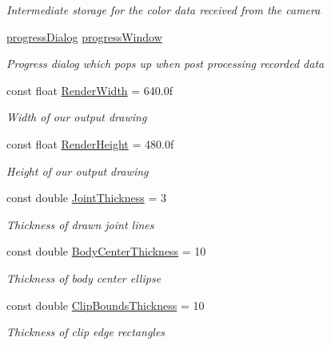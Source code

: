 \begin{DoxyCompactItemize}
\begin{DoxyCompactList}\small\item\em Intermediate storage for the color data received from the camera \end{DoxyCompactList}\item 
\hyperlink{classUTKinectSkeletonMovementDetector_1_1progressDialog}{progress\-Dialog} \hyperlink{classUTKinectSkeletonMovementDetector_1_1MainWindow_ad09c9b8b005cbcc09cb7d1acc722d7c4}{progress\-Window}
\begin{DoxyCompactList}\small\item\em Progress dialog which pops up when post processing recorded data \end{DoxyCompactList}\item 
const float \hyperlink{classUTKinectSkeletonMovementDetector_1_1MainWindow_af3b183ca66b6137dfa971ce2bd41ad61}{Render\-Width} = 640.\-0f
\begin{DoxyCompactList}\small\item\em Width of our output drawing \end{DoxyCompactList}\item 
const float \hyperlink{classUTKinectSkeletonMovementDetector_1_1MainWindow_a83c4f5f87333f29e1e75c98b7a6ba80c}{Render\-Height} = 480.\-0f
\begin{DoxyCompactList}\small\item\em Height of our output drawing \end{DoxyCompactList}\item 
const double \hyperlink{classUTKinectSkeletonMovementDetector_1_1MainWindow_a79ff56663c69c70ea3fa5045d5e37e8b}{Joint\-Thickness} = 3
\begin{DoxyCompactList}\small\item\em Thickness of drawn joint lines \end{DoxyCompactList}\item 
const double \hyperlink{classUTKinectSkeletonMovementDetector_1_1MainWindow_a4f6e1744c877ad860f7ee45ba26b87b8}{Body\-Center\-Thickness} = 10
\begin{DoxyCompactList}\small\item\em Thickness of body center ellipse \end{DoxyCompactList}\item 
const double \hyperlink{classUTKinectSkeletonMovementDetector_1_1MainWindow_a6a0ec4c0958b940fb49cc8ca8a5748c6}{Clip\-Bounds\-Thickness} = 10
\begin{DoxyCompactList}\small\item\em Thickness of clip edge rectangles \end{DoxyCompactList}\item 

\end{DoxyCompactItemize}

